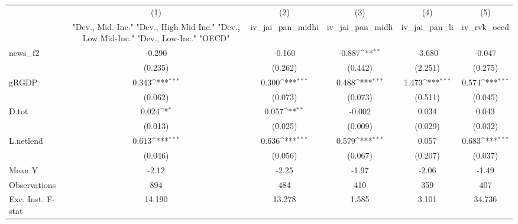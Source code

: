{
\def\sym#1{\ifmmode^{#1}\else\(^{#1}\)\fi}
\begin{tabular}{l*{5}{c}}
\toprule
            &\multicolumn{1}{c}{(1)}&\multicolumn{1}{c}{(2)}&\multicolumn{1}{c}{(3)}&\multicolumn{1}{c}{(4)}&\multicolumn{1}{c}{(5)}\\
            &\multicolumn{1}{c}{ "Dev., Mid.-Inc." "Dev., High Mid-Inc." "Dev., Low Mid-Inc." "Dev., Low-Inc." "OECD" }&\multicolumn{1}{c}{iv\_jai\_pan\_midhi}&\multicolumn{1}{c}{iv\_jai\_pan\_midli}&\multicolumn{1}{c}{iv\_jai\_pan\_li}&\multicolumn{1}{c}{iv\_rvk\_oecd}\\
\midrule
news\_f2     &      -0.290         &      -0.160         &      -0.887\sym{**} &      -3.680         &      -0.047         \\
            &     (0.235)         &     (0.262)         &     (0.442)         &     (2.251)         &     (0.275)         \\
\addlinespace
gRGDP       &       0.343\sym{***}&       0.300\sym{***}&       0.488\sym{***}&       1.473\sym{***}&       0.574\sym{***}\\
            &     (0.062)         &     (0.073)         &     (0.073)         &     (0.511)         &     (0.045)         \\
\addlinespace
D.tot       &       0.024\sym{*}  &       0.057\sym{**} &      -0.002         &       0.034         &       0.043         \\
            &     (0.013)         &     (0.025)         &     (0.009)         &     (0.029)         &     (0.032)         \\
\addlinespace
L.netlend   &       0.613\sym{***}&       0.636\sym{***}&       0.579\sym{***}&       0.057         &       0.683\sym{***}\\
            &     (0.046)         &     (0.056)         &     (0.067)         &     (0.207)         &     (0.037)         \\
\midrule
Mean Y      &       -2.12         &       -2.25         &       -1.97         &       -2.06         &       -1.49         \\
Observations&         894         &         484         &         410         &         359         &         407         \\
Exc. Inst. F-stat&      14.190         &      13.278         &       1.585         &       3.101         &      34.736         \\
\bottomrule
\end{tabular}
}
